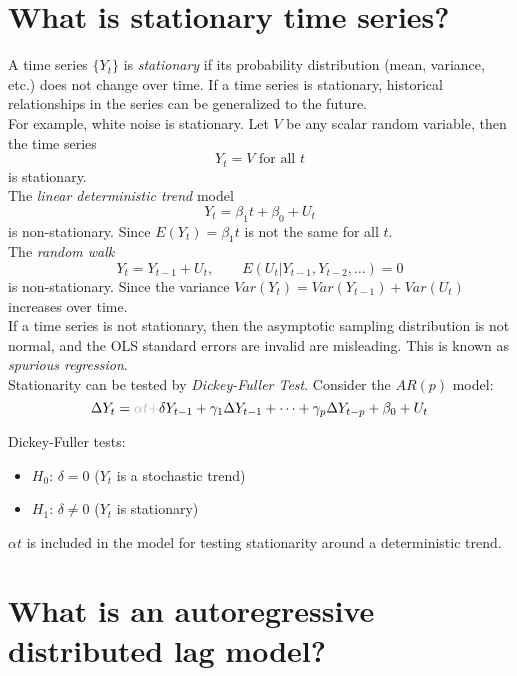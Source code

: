 \documentclass[%
 aip,
 jmp,%
 amsmath,amssymb,
 reprint,%
]{revtex4-1}
\newcommand{\term}[1]{\emph{#1}}
\begin{document}
\section*{What is stationary time series?}

A time series $\{Y_t\}$ is \term{stationary} if its probability distribution (mean, variance, etc.) 
does not change over time. If a time series is stationary, historical relationships in the series 
can be generalized to the future. \\

For example, white noise is stationary. Let $V$ be any scalar random variable, then the time series 
$$ Y_t = V \textrm{ for all } t $$
is stationary. \\

The \term{linear deterministic trend} model 
$$ Y_t = \beta_1 t + \beta_0 + U_t $$
is non-stationary. Since $E(Y_t) = \beta_1 t$ is not the same for all $t$.\\

The \term{random walk}
$$ Y_t = Y_{t-1} + U_t,\qquad E(U_t|Y_{t-1}, Y_{t-2}, \dots)=0 $$
is non-stationary. Since the variance $Var(Y_t) = Var(Y_{t-1}) + Var(U_t)$ increases over time. \\

If a time series is not stationary, then the asymptotic sampling distribution is not normal, and 
the OLS standard errors are invalid are misleading. This is known as \term{spurious regression}. \\

Stationarity can be tested by \term{Dickey-Fuller Test}. Consider the $AR(p)$ model:
$$ \Delta Y_t = {\color{lightgray}{\alpha t + }} \delta Y_{t-1} + \gamma_1 \Delta Y_{t-1} + 
     \cdots + \gamma_p \Delta Y_{t-p} + \beta_0 + U_t 
$$

Dickey-Fuller tests:
    \begin{itemize}
        \item[{}] $H_0$: $\delta = 0$ ($Y_t$ is a stochastic trend)
        \item[{}] $H_1$: $\delta \neq 0$ ($Y_t$ is stationary)
    \end{itemize}

$\alpha t$ is included in the model for testing stationarity around a deterministic trend. \\


\section*{What is an autoregressive distributed lag model?}
\end{document}
